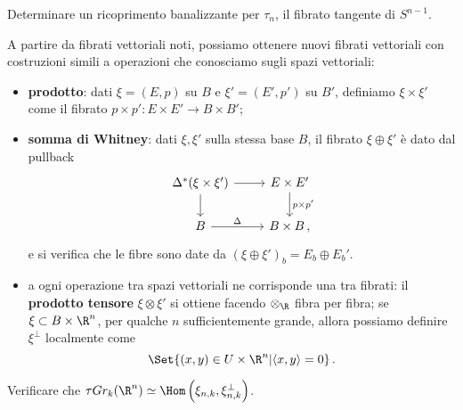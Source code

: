 \begin{exercise}
	Determinare un ricoprimento banalizzante per $\tau_{n}$, 
	il fibrato tangente di $S^{n-1}$.
\end{exercise}

A partire da fibrati vettoriali noti,
possiamo ottenere nuovi fibrati vettoriali con costruzioni
simili a operazioni che conosciamo sugli spazi vettoriali:
\begin{itemize}
	\item \textbf{prodotto}: dati
	$\xi = (E,p)$ su $B$ e $\xi'=(E',p')$ su $B'$,
	definiamo $\xi \times \xi'$ come il fibrato $p \times p' : E \times E' \to B \times B'$;
	
	\item \textbf{somma di Whitney}: dati $\xi,\xi'$ sulla stessa base $B$,
	il fibrato $\xi \oplus \xi'$
	è dato dal pullback
	\begin{equation*}
		\begin{tikzcd}
			\Delta^{*}(\xi \times \xi') \ar[r] \ar[d]
			& E \times E' \ar[d, "p \times p'"] \\
			B \ar[r, "\Delta"] & B \times B\,,
		\end{tikzcd}
	\end{equation*}
	e si verifica che le fibre sono date da $\left( \xi \oplus \xi' \right)_{b} = E_{b} \oplus E_{b}'$.
	
	\item a ogni operazione tra spazi vettoriali ne corrisponde una tra fibrati:
	il \textbf{prodotto tensore} $\xi \otimes \xi'$ si ottiene facendo $\otimes_{\R}$ fibra per fibra;
	se $\xi \subset B \times \R^{n}$, per qualche $n$ sufficientemente grande, 
	allora possiamo definire $\xi^{\perp}$
	localmente come 
	\begin{equation*}
		\Set{(x,y) \in U \times \R^{n} | \langle x , y \rangle = 0}\,.
	\end{equation*}
\end{itemize}

\begin{exercise}
	Verificare che $\tau Gr_{k}(\R^{n}) \simeq \Hom\left(\xi_{n,k},\xi_{n,k}^{\perp}\right)$.
\end{exercise}



